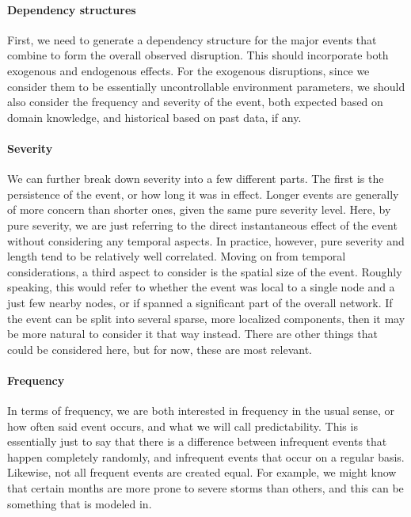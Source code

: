 \paragraph{Dependency structures} First, we need to generate a dependency structure for the major events that combine to form the overall observed disruption. This should incorporate both exogenous and endogenous effects. For the exogenous disruptions, since we consider them to be essentially uncontrollable environment parameters, we should also consider the frequency and severity of the event, both expected based on domain knowledge, and historical based on past data, if any. 

\paragraph{Severity} We can further break down severity into a few different parts. The first is the persistence of the event, or how long it was in effect. Longer events are generally of more concern than shorter ones, given the same pure severity level. Here, by pure severity, we are just referring to the direct instantaneous effect of the event without considering any temporal aspects. In practice, however, pure severity and length tend to be relatively well correlated. Moving on from temporal considerations, a third aspect to consider is the spatial size of the event. Roughly speaking, this would refer to whether the event was local to a single node and a just few nearby nodes, or if spanned a significant part of the overall network. If the event can be split into several sparse, more localized components, then it may be more natural to consider it that way instead. There are other things that could be considered here, but for now, these are most relevant.

\paragraph{Frequency} In terms of frequency, we are both interested in frequency in the usual sense, or how often said event occurs, and what we will call predictability. This is essentially just to say that there is a difference between infrequent events that happen completely randomly, and infrequent events that occur on a regular basis. Likewise, not all frequent events are created equal. For example, we might know that certain months are more prone to severe storms than others, and this can be something that is modeled in. 

